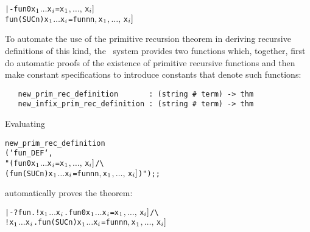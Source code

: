 {{\begin{hol}\begin{alltt}
   |- fun 0 x\(\sb{1}\) \(\dots\) x\(\sb{i}\) = \m{f\sb{1}[}x\(\sb{1}\)\(,\ldots,\,\)x\(\sb{i}]\)
      fun (SUC n) x\(\sb{1}\) \(\dots\) x\(\sb{i}\) = \m{f\sb{2}[}fun n  n\(,\) x\(\sb{1}\)\(,\ldots,\,\)x\(\sb{i}]\)
\end{alltt}\end{hol}

To automate the use of the primitive recursion theorem in deriving recursive
definitions of this kind, the \HOL\ system provides two functions which,
together, first do automatic proofs of the existence of primitive recursive
functions and then make constant specifications to introduce constants that
denote such functions:

\begin{boxed}
\begin{verbatim}
   new_prim_rec_definition       : (string # term) -> thm
   new_infix_prim_rec_definition : (string # term) -> thm
\end{verbatim}\end{boxed}

\noindent Evaluating

\begin{hol}\begin{alltt}
   new_prim_rec_definition
    (`fun_DEF`,
     "(fun 0 x\(\sb{1}\) \(\dots\) x\(\sb{i}\) = \m{f\sb{1}[}x\(\sb{1}\)\(,\ldots,\,\)x\(\sb{i}]\) /\verb!\!
      (fun (SUC n) x\(\sb{1}\) \(\dots\) x\(\sb{i}\) = \m{f\sb{2}[}fun n  n\(,\) x\(\sb{1}\)\(,\ldots,\,\)x\(\sb{i}]\))");;
\end{alltt}\end{hol}

\noindent automatically proves the theorem:

\begin{hol}\begin{alltt}
   |-  ?fun. !x\(\sb{1}\) \(\dots\) x\(\sb{i}\). fun 0 x\(\sb{1}\) \(\dots\) x\(\sb{i}\) = \m{f\sb{1}[}x\(\sb{1}\)\(,\ldots,\,\)x\(\sb{i}]\) /\verb!\!
             !x\(\sb{1}\) \(\dots\) x\(\sb{i}\). fun (SUC n) x\(\sb{1}\) \(\dots\) x\(\sb{i}\) = \m{f\sb{2}[}fun n  n\(,\) x\(\sb{1}\)\(,\ldots,\,\)x\(\sb{i}]\)
\end{alltt}\end{hol}

}}
